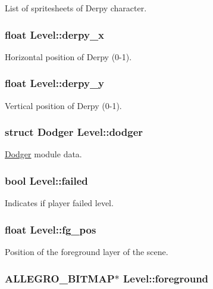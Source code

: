 List of spritesheets of Derpy character. \hypertarget{structLevel_ae5a97d5b61c70c63e93992a9ff3935f9}{
\subsubsection[{derpy\-\_\-x}]{\setlength{\rightskip}{0pt plus 5cm}float Level\-::derpy\-\_\-x}}\label{structLevel_ae5a97d5b61c70c63e93992a9ff3935f9}
Horizontal position of Derpy (0-\/1). \hypertarget{structLevel_a7b3c0f5af134797a1ed21ef48da3ab00}{
\subsubsection[{derpy\-\_\-y}]{\setlength{\rightskip}{0pt plus 5cm}float Level\-::derpy\-\_\-y}}\label{structLevel_a7b3c0f5af134797a1ed21ef48da3ab00}
Vertical position of Derpy (0-\/1). \hypertarget{structLevel_a2b3fe84587aa6335e2d9c8d961e529cc}{
\subsubsection[{dodger}]{\setlength{\rightskip}{0pt plus 5cm}struct {\bf Dodger} Level\-::dodger}}\label{structLevel_a2b3fe84587aa6335e2d9c8d961e529cc}
\hyperlink{structDodger}{Dodger} module data. \hypertarget{structLevel_a5bea34b31777260f1b23a1d64e6cd865}{
\subsubsection[{failed}]{\setlength{\rightskip}{0pt plus 5cm}bool Level\-::failed}}\label{structLevel_a5bea34b31777260f1b23a1d64e6cd865}
Indicates if player failed level. \hypertarget{structLevel_a665bb93951ab6b7a91543712152a3acf}{
\subsubsection[{fg\-\_\-pos}]{\setlength{\rightskip}{0pt plus 5cm}float Level\-::fg\-\_\-pos}}\label{structLevel_a665bb93951ab6b7a91543712152a3acf}
Position of the foreground layer of the scene. \hypertarget{structLevel_a26c758ccdc7404a3ee0e766d1cbbf0be}{
\subsubsection[{foreground}]{\setlength{\rightskip}{0pt plus 5cm}A\-L\-L\-E\-G\-R\-O\-\_\-\-B\-I\-T\-M\-A\-P$\ast$ Level\-::foreground}}\label{structLevel_a26c758ccdc7404a3ee0e766d1cbbf0be}
